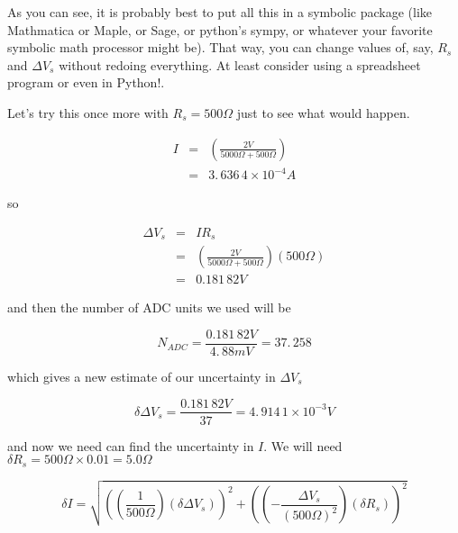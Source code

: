 As you can see, it is probably best to put all this in a symbolic package (like Mathmatica or Maple, or Sage, or python's sympy, or whatever your favorite symbolic math processor might be). That way, you can change values of, say, $R_{s}$ and $\Delta V_{s}$ without redoing everything. At least consider using a spreadsheet program or even in Python!.

Let's try this once more with $R_{s}=500\unit{\Omega}$ just to see what would happen.

\begin{eqnarray*}
	I &=&\left( \frac{2\unit{V}}{5000\unit{\Omega}+500\unit{\Omega}}\right) \\
      &=&3.\,\allowbreak 636\,4\times 10^{-4}\unit{A}
\end{eqnarray*}

\noindent so

\begin{eqnarray*}
	\Delta V_{s} &=&IR_{s} \\
                 &=&\left( \frac{2\unit{V}}{5000\unit{\Omega}+500\unit{\Omega}}\right) \left( 500\unit{\Omega}\right) \\
                 &=&0.181\,82\unit{V}
\end{eqnarray*}

\noindent and then the number of ADC units we used will be 

\begin{equation*}
     N_{ADC}=\frac{0.181\,82\unit{V}}{4.\,\allowbreak 88\unit{mV}}=37.\,\allowbreak 258
\end{equation*}

\noindent which gives a new estimate of our uncertainty in $\Delta V_{s}$ 

\begin{equation*}
    \delta \Delta V_{s}=\frac{0.181\,82\unit{V}}{37}=4.\,\allowbreak914\,1\times 10^{-3}\unit{V}
\end{equation*}

\noindent and now we need can find the uncertainty in $I.$ We will need $\delta
R_{s}=500\unit{\Omega}\times 0.01=\allowbreak 5.0\unit{\Omega}$

\begin{equation*}
	\delta I=\sqrt{\left( \left( \frac{1}{500\unit{\Omega}}\right) \left( \delta \Delta V_{s}\right) \right) ^{2}+\left( \left( -\frac{\Delta V_{s}}{\left( 500\unit{\Omega}\right) ^{2}}\right) \left( \delta R_{s}\right) \right) ^{2}}
\end{equation*}

